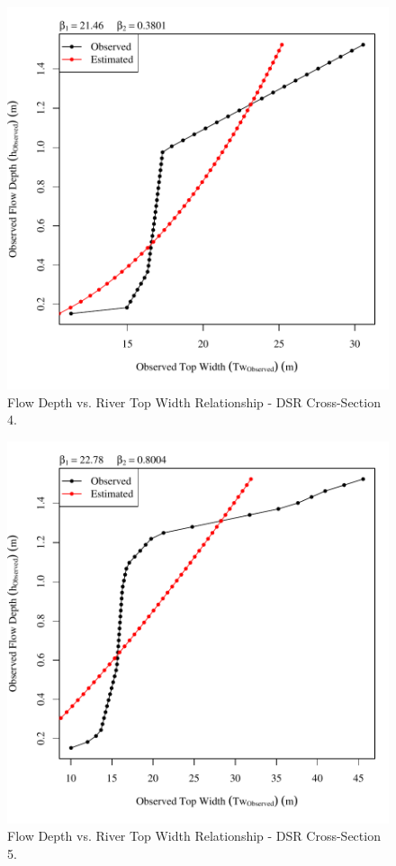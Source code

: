 \begin{center}
\begin{figure}[htbp]
	\includegraphics[width=6in]{"Figures/Results_DSR/Survey Tw vs H-Section 4"}
	\caption{Flow Depth vs. River Top Width Relationship - DSR Cross-Section 4.}
\end{figure}
\end{center}
\newpage

\begin{center}
\begin{figure}[htbp]
	\includegraphics[width=6in]{"Figures/Results_DSR/Survey Tw vs H-Section 5"}
	\caption{Flow Depth vs. River Top Width Relationship - DSR Cross-Section 5.}
\end{figure}
\end{center}
\newpage

